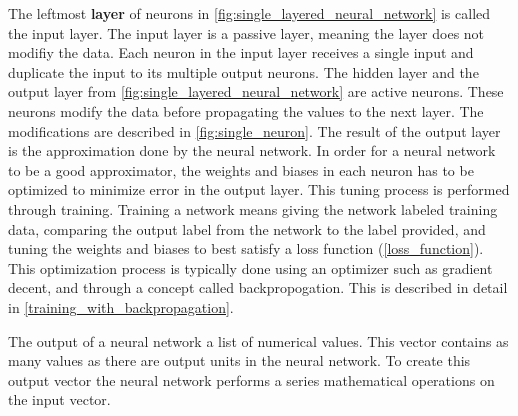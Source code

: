 The leftmost \textbf{\gls{layer}} of neurons in \ref{fig:single_layered_neural_network} is called the input layer. The input layer is a passive layer, meaning the layer does not modifiy the data. Each neuron in the input layer receives a single input and duplicate the input to its multiple output neurons. The hidden layer and the output layer from \ref{fig:single_layered_neural_network} are active neurons. These neurons modify the data before propagating the values to the next layer. The modifications are described in \ref{fig:single_neuron}. The result of the output layer is the approximation done by the neural network. \parencite{smith_scientist_1997} 
In order for a neural network to be a good approximator, the weights and biases in each neuron has to be optimized to minimize error in the output layer. This tuning process is performed through training. Training a network means giving the network labeled training data, comparing the output label from the network to the label provided, and tuning the weights and biases to best satisfy a loss function (\ref{loss_function}). This optimization process is typically done using an optimizer such as gradient decent, and through a concept called backpropogation. This is described in detail in \ref{training_with_backpropagation}.
% 

The output of a neural network a list of numerical values. This vector contains as many values as there are output units in the neural network. To create this output vector the neural network performs a series mathematical operations on the input vector. 


